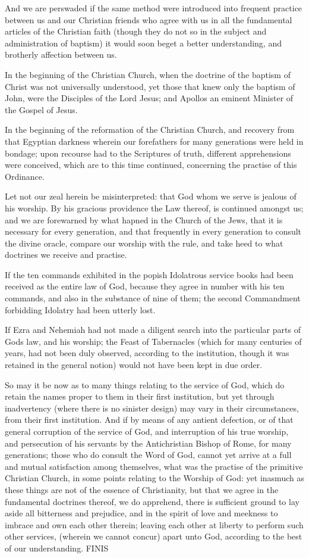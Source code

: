 \documentclass[12pt,a4paper]{book}
\begin{document}
And we are perswaded if the same method were introduced into frequent practice between us and our Christian friends who agree with us in all the fundamental articles of the Christian faith (though they do not so in the subject and administration of baptism) it would soon beget a better understanding, and brotherly affection between us.

In the beginning of the Christian Church, when the doctrine of the baptism of Christ was not universally understood, yet those that knew only the baptism of John, were the Disciples of the Lord Jesus; and Apollos an eminent Minister of the Gospel of Jesus.

In the beginning of the reformation of the Christian Church, and recovery from that Egyptian darkness wherein our forefathers for many generations were held in bondage; upon recourse had to the Scriptures of truth, different apprehensions were conceived, which are to this time continued, concerning the practise of this Ordinance.

Let not our zeal herein be misinterpreted: that God whom we serve is jealous of his worship. By his gracious providence the Law thereof, is continued amongst us; and we are forewarned by what hapned in the Church of the Jews, that it is necessary for every generation, and that frequently in every generation to consult the divine oracle, compare our worship with the rule, and take heed to what doctrines we receive and practise.

If the ten commands exhibited in the popish Idolatrous service books had been received as the entire law of God, because they agree in number with his ten commands, and also in the substance of nine of them; the second Commandment forbidding Idolatry had been utterly lost.

If Ezra and Nehemiah had not made a diligent search into the particular parts of Gods law, and his worship; the Feast of Tabernacles (which for many centuries of years, had not been duly observed, according to the institution, though it was retained in the general notion) would not have been kept in due order.

So may it be now as to many things relating to the service of God, which do retain the names proper to them in their first institution, but yet through inadvertency (where there is no sinister design) may vary in their circumstances, from their first institution. And if by means of any antient defection, or of that general corruption of the service of God, and interruption of his true worship, and persecution of his servants by the Antichristian Bishop of Rome, for many generations; those who do consult the Word of God, cannot yet arrive at a full and mutual satisfaction among themselves, what was the practise of the primitive Christian Church, in some points relating to the Worship of God: yet inasmuch as these things are not of the essence of Christianity, but that we agree in the fundamental doctrines thereof, we do apprehend, there is sufficient ground to lay aside all bitterness and prejudice, and in the spirit of love and meekness to imbrace and own each other therein; leaving each other at liberty to perform such other services, (wherein we cannot concur) apart unto God, according to the best of our understanding.
FINIS
\end{document}
